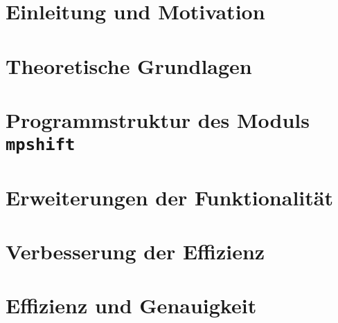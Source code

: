 \documentclass[
  paper=A4, 		%
  pagesize, 		%
  DIV=12, 		%
  ngerman,  		%
  12pt, 			%
  listof=totocnumbered, 
  bibliography=totoc, 
  index=totoc, 
  openany, 
]{scrbook}
\begin{document}
\newcommand{\iu}{\mathrm{i}\mkern1mu}
\newcommand*\diff{\mathop{}\!\mathrm{d}}
\newcommand*\Diff[1]{\mathop{}\!\mathrm{d^#1}}

\frontmatter
 
\restoregeometry
\thispagestyle{empty}
\cleardoublepage

%  



\setcounter{secnumdepth}{5}
\setcounter{tocdepth}{5}
\tableofcontents

\mainmatter %

\chapter{Einleitung und Motivation}\label{einleitung}


\chapter{Theoretische Grundlagen}\label{theorie}


\chapter{Programmstruktur des Moduls \texttt{mpshift}}\label{programmstruktur}


\chapter{Erweiterungen der Funktionalität}\label{funktionalität}



\chapter{Verbesserung der Effizienz}\label{effizienz}


\chapter{Effizienz und Genauigkeit}\label{genauigkeit}

\end{document}
